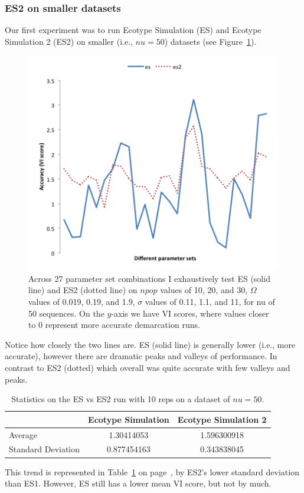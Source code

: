 \subsubsection*{ES2 on smaller datasets}
Our first experiment was to run Ecotype Simulation (ES) and Ecotype Simulation 2 (ES2) on smaller (i.e., $nu = 50$) datasets (see Figure~\ref{fig:ESvES2}).

\begin{figure}[h!]
  \centering
    \includegraphics[scale=0.75]{images/ResultGraphs/ResultGraphs-4}
      \caption[ES vs ES2 accuracy visualization on $nu = 50$.]{Across 27 parameter set combinations I exhaustively test ES (solid line) and ES2 (dotted line) on $npop$ values of 10, 20, and 30, $\Omega$ values of 0.019, 0.19, and 1.9, $\sigma$ values of 0.11, 1.1, and 11, for nu of 50 sequences. On the $y$-axis we have VI scores, where values closer to 0 represent more accurate demarcation runs.}
    \label{fig:ESvES2}
\end{figure}

\noindent Notice how closely the two lines are.
ES (solid line) is generally lower (i.e., more accurate), however there are dramatic peaks and valleys of performance.
In contrast to ES2 (dotted) which overall was quite accurate with few valleys and peaks.
\begin{table}
    \begin{tabular}{l|cc}
    ~                  & Ecotype Simulation & Ecotype Simulation 2 \\ \hline
    Average            & 1.30414053         & 1.596300918          \\
    Standard Deviation & 0.877454163        & 0.343838045          \\
    \end{tabular}
    \caption[ES versus ES2 statistics.]{Statistics on the ES vs ES2 run with 10 reps on a dataset of $nu=50$.}
    \label{tab:ESvES2mean}
\end{table}
This trend is represented in Table~\ref{tab:ESvES2mean} on page~\pageref{tab:ESvES2mean}, by ES2's lower standard deviation than ES1.
However, ES still has a lower mean VI score, but not by much.

